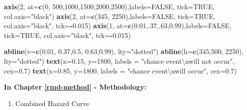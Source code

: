 \documentclass[12pt,oneside]{reedthesis}
\newenvironment{Shaded}{\begin{snugshade}}{\end{snugshade}}
\newcommand{\CharTok}[1]{\textcolor[rgb]{0.31,0.60,0.02}{#1}}
\newcommand{\DataTypeTok}[1]{\textcolor[rgb]{0.13,0.29,0.53}{#1}}
\newcommand{\DecValTok}[1]{\textcolor[rgb]{0.00,0.00,0.81}{#1}}
\newcommand{\FloatTok}[1]{\textcolor[rgb]{0.00,0.00,0.81}{#1}}
\newcommand{\KeywordTok}[1]{\textcolor[rgb]{0.13,0.29,0.53}{\textbf{#1}}}
\newcommand{\NormalTok}[1]{#1}
\newcommand{\OperatorTok}[1]{\textcolor[rgb]{0.81,0.36,0.00}{\textbf{#1}}}
\newcommand{\OtherTok}[1]{\textcolor[rgb]{0.56,0.35,0.01}{#1}}
\newcommand{\StringTok}[1]{\textcolor[rgb]{0.31,0.60,0.02}{#1}}
\providecommand{\tightlist}{%
  \setlength{\itemsep}{0pt}\setlength{\parskip}{0pt}}
\begin{document}
\begin{Shaded}
\begin{Highlighting}[]
\KeywordTok{axis}\NormalTok{(}\DecValTok{2}\NormalTok{, }\DataTypeTok{at=}\KeywordTok{c}\NormalTok{(}\DecValTok{0}\NormalTok{, }\DecValTok{500}\NormalTok{,}\DecValTok{1000}\NormalTok{,}\DecValTok{1500}\NormalTok{,}\DecValTok{2000}\NormalTok{,}\DecValTok{2500}\NormalTok{),}\DataTypeTok{labels=}\OtherTok{FALSE}\NormalTok{, }\DataTypeTok{tick=}\OtherTok{TRUE}\NormalTok{, }\DataTypeTok{col.axis=}\StringTok{"black"}\NormalTok{)}
\KeywordTok{axis}\NormalTok{(}\DecValTok{2}\NormalTok{, }\DataTypeTok{at=}\KeywordTok{c}\NormalTok{(}\DecValTok{345}\NormalTok{, }\DecValTok{2250}\NormalTok{),}\DataTypeTok{labels=}\OtherTok{FALSE}\NormalTok{, }\DataTypeTok{tick=}\OtherTok{TRUE}\NormalTok{, }\DataTypeTok{col.axis=}\StringTok{"black"}\NormalTok{, }\DataTypeTok{tck=}\OperatorTok{-}\FloatTok{0.015}\NormalTok{)}
\KeywordTok{axis}\NormalTok{(}\DecValTok{1}\NormalTok{, }\DataTypeTok{at=}\KeywordTok{c}\NormalTok{(}\FloatTok{0.01}\NormalTok{,.}\DecValTok{37}\NormalTok{,.}\DecValTok{63}\NormalTok{,}\FloatTok{0.99}\NormalTok{),}\DataTypeTok{labels=}\OtherTok{FALSE}\NormalTok{, }\DataTypeTok{tick=}\OtherTok{TRUE}\NormalTok{, }\DataTypeTok{col.axis=}\StringTok{"black"}\NormalTok{, }\DataTypeTok{tck=}\OperatorTok{-}\FloatTok{0.015}\NormalTok{)}

\KeywordTok{abline}\NormalTok{(}\DataTypeTok{v=}\KeywordTok{c}\NormalTok{(}\FloatTok{0.01}\NormalTok{, }\FloatTok{0.37}\NormalTok{,}\FloatTok{0.5}\NormalTok{, }\FloatTok{0.63}\NormalTok{,}\FloatTok{0.99}\NormalTok{), }\DataTypeTok{lty=}\StringTok{"dotted"}\NormalTok{)}
\KeywordTok{abline}\NormalTok{(}\DataTypeTok{h=}\KeywordTok{c}\NormalTok{(}\DecValTok{345}\NormalTok{,}\DecValTok{500}\NormalTok{, }\DecValTok{2250}\NormalTok{), }\DataTypeTok{lty=}\StringTok{"dotted"}\NormalTok{)}
\KeywordTok{text}\NormalTok{(}\DataTypeTok{x=}\FloatTok{0.15}\NormalTok{,  }\DataTypeTok{y=}\DecValTok{1800}\NormalTok{, }\DataTypeTok{labels =} \StringTok{"chance event}\CharTok{\textbackslash{}n}\StringTok{will not occur"}\NormalTok{, }\DataTypeTok{cex=}\FloatTok{0.7}\NormalTok{)}
\KeywordTok{text}\NormalTok{(}\DataTypeTok{x=}\FloatTok{0.85}\NormalTok{,  }\DataTypeTok{y=}\DecValTok{1800}\NormalTok{, }\DataTypeTok{labels =} \StringTok{"chance event}\CharTok{\textbackslash{}n}\StringTok{will occur"}\NormalTok{, }\DataTypeTok{cex=}\FloatTok{0.7}\NormalTok{)}
\end{Highlighting}
\end{Shaded}
\normalsize

\textbf{In Chapter \ref{rmd-method} - Methodology:}
\begin{enumerate}
\def\labelenumi{\arabic{enumi}.}
\tightlist
\item
  Combined Hazard Curve
\end{enumerate}
\tiny
\end{document}
